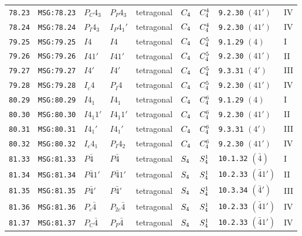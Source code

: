 \documentclass[fleqn,10pt]{jsarticle}
\begin{document}
\begin{center}
\begin{longtable}{lllllllll}
\texttt{78.23} & \texttt{MSG:78.23} & $P_{C}4_{3}$ & $P_{P}4_{3}$ & tetragonal & $C_{\rm 4}$ & $C_{\rm 4}^{4}$ & \texttt{9.2.30} $(41')$ & IV \\
\texttt{78.24} & \texttt{MSG:78.24} & $P_{I}4_{3}$ & $I_{P}4_{1}'$ & tetragonal & $C_{\rm 4}$ & $C_{\rm 4}^{4}$ & \texttt{9.2.30} $(41')$ & IV \\ \hline
\texttt{79.25} & \texttt{MSG:79.25} & $I4$ & $I4$ & tetragonal & $C_{\rm 4}$ & $C_{\rm 4}^{5}$ & \texttt{9.1.29} $(4)$ & I \\
\texttt{79.26} & \texttt{MSG:79.26} & $I41'$ & $I41'$ & tetragonal & $C_{\rm 4}$ & $C_{\rm 4}^{5}$ & \texttt{9.2.30} $(41')$ & II \\
\texttt{79.27} & \texttt{MSG:79.27} & $I4'$ & $I4'$ & tetragonal & $C_{\rm 4}$ & $C_{\rm 4}^{5}$ & \texttt{9.3.31} $(4')$ & III \\
\texttt{79.28} & \texttt{MSG:79.28} & $I_{c}4$ & $P_{I}4$ & tetragonal & $C_{\rm 4}$ & $C_{\rm 4}^{5}$ & \texttt{9.2.30} $(41')$ & IV \\ \hline
\texttt{80.29} & \texttt{MSG:80.29} & $I4_{1}$ & $I4_{1}$ & tetragonal & $C_{\rm 4}$ & $C_{\rm 4}^{6}$ & \texttt{9.1.29} $(4)$ & I \\
\texttt{80.30} & \texttt{MSG:80.30} & $I4_{1}1'$ & $I4_{1}1'$ & tetragonal & $C_{\rm 4}$ & $C_{\rm 4}^{6}$ & \texttt{9.2.30} $(41')$ & II \\
\texttt{80.31} & \texttt{MSG:80.31} & $I4_{1}'$ & $I4_{1}'$ & tetragonal & $C_{\rm 4}$ & $C_{\rm 4}^{6}$ & \texttt{9.3.31} $(4')$ & III \\
\texttt{80.32} & \texttt{MSG:80.32} & $I_{c}4_{1}$ & $P_{I}4_{2}$ & tetragonal & $C_{\rm 4}$ & $C_{\rm 4}^{6}$ & \texttt{9.2.30} $(41')$ & IV \\ \hline
\texttt{81.33} & \texttt{MSG:81.33} & $P\bar{4}$ & $P\bar{4}$ & tetragonal & $S_{\rm 4}$ & $S_{\rm 4}^{1}$ & \texttt{10.1.32} $(\bar{4})$ & I \\
\texttt{81.34} & \texttt{MSG:81.34} & $P\bar{4}1'$ & $P\bar{4}1'$ & tetragonal & $S_{\rm 4}$ & $S_{\rm 4}^{1}$ & \texttt{10.2.33} $(\bar{4}1')$ & II \\
\texttt{81.35} & \texttt{MSG:81.35} & $P\bar{4}'$ & $P\bar{4}'$ & tetragonal & $S_{\rm 4}$ & $S_{\rm 4}^{1}$ & \texttt{10.3.34} $(\bar{4}')$ & III \\
\texttt{81.36} & \texttt{MSG:81.36} & $P_{c}\bar{4}$ & $P_{2c}\bar{4}$ & tetragonal & $S_{\rm 4}$ & $S_{\rm 4}^{1}$ & \texttt{10.2.33} $(\bar{4}1')$ & IV \\
\texttt{81.37} & \texttt{MSG:81.37} & $P_{C}\bar{4}$ & $P_{P}\bar{4}$ & tetragonal & $S_{\rm 4}$ & $S_{\rm 4}^{1}$ & \texttt{10.2.33} $(\bar{4}1')$ & IV \\

\end{longtable}
\end{center}
\end{document}

